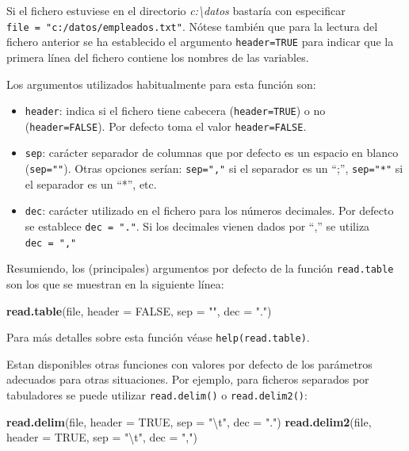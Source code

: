 \documentclass[]{book}
\newenvironment{Shaded}{\begin{snugshade}}{\end{snugshade}}
\newcommand{\KeywordTok}[1]{\textcolor[rgb]{0.13,0.29,0.53}{\textbf{#1}}}
\newcommand{\DataTypeTok}[1]{\textcolor[rgb]{0.13,0.29,0.53}{#1}}
\newcommand{\CharTok}[1]{\textcolor[rgb]{0.31,0.60,0.02}{#1}}
\newcommand{\StringTok}[1]{\textcolor[rgb]{0.31,0.60,0.02}{#1}}
\newcommand{\OtherTok}[1]{\textcolor[rgb]{0.56,0.35,0.01}{#1}}
\newcommand{\NormalTok}[1]{#1}
\begin{document}
Si el fichero estuviese en el directorio \emph{c:\textbackslash{}datos}
bastaría con especificar \texttt{file\ =\ "c:/datos/empleados.txt"}.
Nótese también que para la lectura del fichero anterior se ha
establecido el argumento \texttt{header=TRUE} para indicar que la
primera línea del fichero contiene los nombres de las variables.

Los argumentos utilizados habitualmente para esta función son:

\begin{itemize}
\item
  \texttt{header}: indica si el fichero tiene cabecera
  (\texttt{header=TRUE}) o no (\texttt{header=FALSE}). Por defecto toma
  el valor \texttt{header=FALSE}.
\item
  \texttt{sep}: carácter separador de columnas que por defecto es un
  espacio en blanco (\texttt{sep=""}). Otras opciones serían:
  \texttt{sep=","} si el separador es un ``;'', \texttt{sep="*"} si el
  separador es un ``*'', etc.
\item
  \texttt{dec}: carácter utilizado en el fichero para los números
  decimales. Por defecto se establece \texttt{dec\ =\ "."}. Si los
  decimales vienen dados por ``,'' se utiliza \texttt{dec\ =\ ","}
\end{itemize}

Resumiendo, los (principales) argumentos por defecto de la función
\texttt{read.table} son los que se muestran en la siguiente línea:

\begin{Shaded}
\begin{Highlighting}[]
\KeywordTok{read.table}\NormalTok{(file, }\DataTypeTok{header =} \OtherTok{FALSE}\NormalTok{, }\DataTypeTok{sep =} \StringTok{""}\NormalTok{, }\DataTypeTok{dec =} \StringTok{"."}\NormalTok{)  }
\end{Highlighting}
\end{Shaded}

Para más detalles sobre esta función véase \texttt{help(read.table)}.

Estan disponibles otras funciones con valores por defecto de los
parámetros adecuados para otras situaciones. Por ejemplo, para ficheros
separados por tabuladores se puede utilizar \texttt{read.delim()} o
\texttt{read.delim2()}:

\begin{Shaded}
\begin{Highlighting}[]
\KeywordTok{read.delim}\NormalTok{(file, }\DataTypeTok{header =} \OtherTok{TRUE}\NormalTok{, }\DataTypeTok{sep =} \StringTok{"}\CharTok{\textbackslash{}t}\StringTok{"}\NormalTok{, }\DataTypeTok{dec =} \StringTok{"."}\NormalTok{)}
\KeywordTok{read.delim2}\NormalTok{(file, }\DataTypeTok{header =} \OtherTok{TRUE}\NormalTok{, }\DataTypeTok{sep =} \StringTok{"}\CharTok{\textbackslash{}t}\StringTok{"}\NormalTok{, }\DataTypeTok{dec =} \StringTok{","}\NormalTok{)}
\end{Highlighting}
\end{Shaded}
\end{document}
